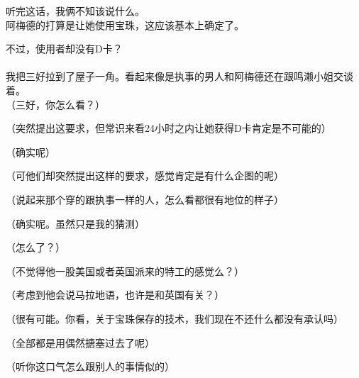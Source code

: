听完这话，我俩不知该说什么。\\

阿梅德的打算是让她使用宝珠，这应该基本上确定了。

不过，使用者却没有D卡？\\

\\

我把三好拉到了屋子一角。看起来像是执事的男人和阿梅德还在跟鸣濑小姐交谈着。\\

（三好，你怎么看？）

（突然提出这要求，但常识来看24小时之内让她获得D卡肯定是不可能的）

（确实呢）

（可他们却突然提出这样的要求，感觉肯定是有什么企图的呢）

（说起来那个穿的跟执事一样的人，怎么看都很有地位的样子）

（确实呢。虽然只是我的猜测）

（怎么了？）

（不觉得他一股美国或者英国派来的特工的感觉么？）

（考虑到他会说马拉地语，也许是和英国有关？）

（很有可能。你看，关于宝珠保存的技术，我们现在不还什么都没有承认吗）

（全部都是用偶然搪塞过去了呢）

（听你这口气怎么跟别人的事情似的）\\

